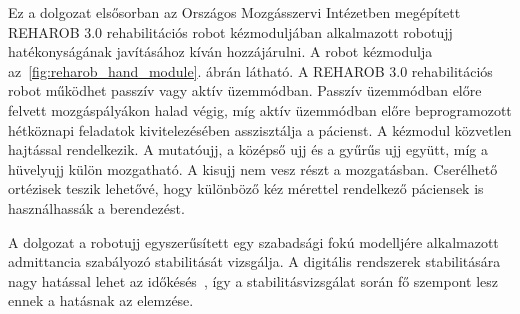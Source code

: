 Ez a dolgozat elsősorban az Országos Mozgásszervi Intézetben megépített REHAROB 3.0 
rehabilitációs robot kézmoduljában alkalmazott robotujj hatékonyságának javításához kíván hozzájárulni.
A robot kézmodulja az~\ref{fig:reharob_hand_module}. ábrán látható.
A REHAROB 3.0 rehabilitációs robot működhet passzív vagy aktív üzemmódban. Passzív üzemmódban előre felvett 
mozgáspályákon halad végig, míg aktív üzemmódban előre beprogramozott hétköznapi feladatok 
kivitelezésében asszisztálja a pácienst. A kézmodul közvetlen hajtással rendelkezik. A mutatóujj, a középső ujj és a
gyűrűs ujj együtt, míg a hüvelyujj külön mozgatható. A kisujj nem vesz részt a mozgatásban. Cserélhető ortézisek 
teszik lehetővé, hogy különböző kéz mérettel rendelkező páciensek is használhassák a berendezést.


A dolgozat a robotujj egyszerűsített egy szabadsági fokú modelljére alkalmazott admittancia szabályozó stabilitását vizsgálja.
A digitális rendszerek stabilitására nagy hatással lehet az időkésés~\citep{stepan1989retarded,stepan2001vibrations}, így a 
stabilitásvizsgálat során fő szempont lesz ennek a hatásnak az elemzése.


    
    
